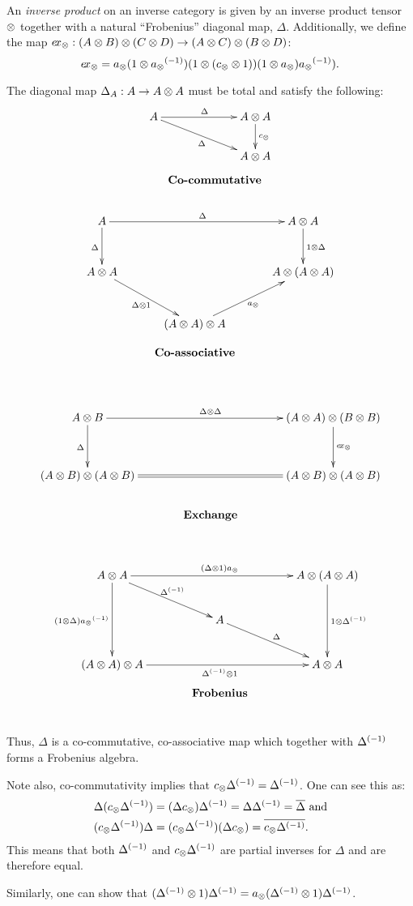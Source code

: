 \begin{definition}\label{def:inverse_product}
  An \emph{inverse product} on an inverse category \X is given by an inverse product tensor $\otimes$
  together with a  natural ``Frobenius'' diagonal map, $\Delta$. Additionally, we define the
  map $e\!x_{\otimes}: (A\otimes B)\otimes(C\otimes D) \to (A\otimes C) \otimes (B\otimes D)$:
  \[
    e\!x_{\otimes} =  a_{\otimes}(1\otimes{a_{\otimes}}^{(-1)})(1\otimes(c_{\otimes}\otimes1))(1\otimes a_{\otimes}){a_{\otimes}}^{(-1)}).
  \]

  The diagonal map $\Delta_A:A \to A\otimes A$ must be total and satisfy the following:
  \[
    \xymatrix @!0 @C=90pt @R=35pt{
      A \ar[dr]_{\Delta} \ar[r]^{\Delta} &
      A \* A \ar[d]^{c_{\*}}\\
      & A \* A\\
      &*!<3pc,-15pt>{\text{\textbf{Co-commutative}}}
    }
  \]
  \[
    \xymatrix @C=30pt @R=30pt{
      A \ar[rr]^{\Delta} \ar[d]_{\Delta} & &
      A \* A \ar[d]^{1\*\Delta}\\
      A\*A \ar[dr]_{\Delta \* 1}& & A \* ( A \* A) \\
      &   (A \* A) \* A \ar[ur]_{a_{\*}}\\
      &*!<0pc,-35pt>{\text{\textbf{Co-associative}}}
    }
  \]
  \[
    \xymatrix @C=40pt @R=35pt{
      A \* B \ar[d]_{\Delta}
      \ar[rr]^{\Delta \* \Delta} & &
      (A \* A) \* (B \* B) \ar[d]^{\excs}\\
      (A \* B) \* (A \* B) \ar@{=}[rr] & &
      (A \* B) \* (A \* B)\\
      &*!<0pc,-25pt>{\text{\textbf{Exchange}}}
    }
  \]

  \[
    \xymatrix @C=40pt @R=25pt{
      A \* A \ar[dd]_{(1\*\Delta) \inv{a_{\*}}} \ar[dr]^{\inv{\Delta}}
      \ar[rr]^{(\Delta \* 1) a_{\*}} & &
      A \* (A \* A) \ar[dd]^{1 \* \inv{\Delta}}\\
      & A \ar[dr]^{\Delta} & \\
      (A \* A) \* A \ar[rr]_{\inv{\Delta} \* 1} & &
      A \* A\\
      &*!<0pc,-25pt>{\text{\textbf{Frobenius}}}
    }
  \]
  Thus, $\Delta$ is a co-commutative, co-associative map which together with ${\Delta}^{(-1)}$ forms a
  Frobenius algebra.
\end{definition}

\begin{remark}
  Note also, co-commutativity implies that $c_{\otimes}{\Delta}^{(-1)} = {\Delta}^{(-1)}$.
  One can see this as:
  \begin{align*}
    \Delta(c_{\otimes}{\Delta}^{(-1)})
      &= (\Delta c_{\otimes}){\Delta}^{(-1)} = \Delta{\Delta}^{(-1)} = \overline{\Delta} \text{ and}\\
    (c_{\otimes}{\Delta}^{(-1)})\Delta
      & = (c_{\otimes}{\Delta}^{(-1)})(\Delta c_{\otimes}) = \overline{c_{\otimes}{\Delta}^{(-1)}}.
  \end{align*}
  This means that both ${\Delta}^{(-1)}$ and $c_{\otimes}{\Delta}^{(-1)}$ are partial inverses for $\Delta$
  and are therefore equal.

  Similarly, one can show that $({\Delta}^{(-1)}\otimes 1){\Delta}^{(-1)} =
  a_{\otimes}({\Delta}^{(-1)}\otimes 1){\Delta}^{(-1)}$.
\end{remark}


